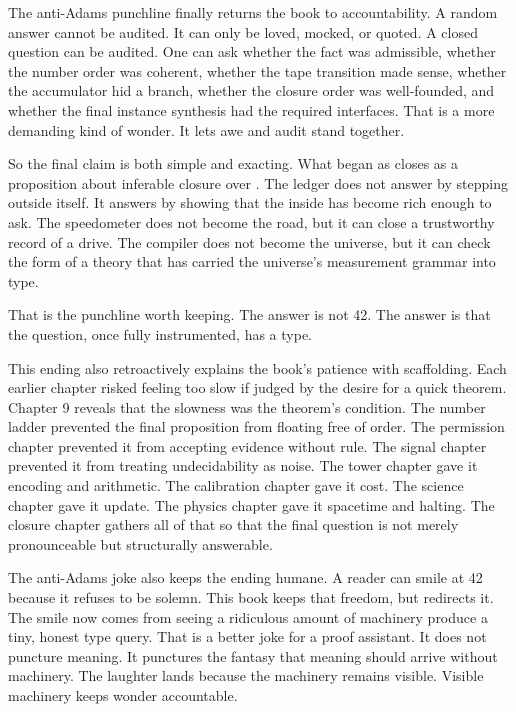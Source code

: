 The anti-Adams punchline finally returns the book to accountability. A random
answer cannot be audited. It can only be loved, mocked, or quoted. A closed
question can be audited. One can ask whether the fact was admissible, whether
the number order was coherent, whether the tape transition made sense, whether
the accumulator hid a branch, whether the closure order was well-founded, and
whether the final instance synthesis had the required interfaces. That is a
more demanding kind of wonder. It lets awe and audit stand together.

So the final claim is both simple and exacting. What began as 
closes as a proposition about inferable closure over . The ledger
does not answer by stepping outside itself. It answers by showing that the
inside has become rich enough to ask. The speedometer does not become the
road, but it can close a trustworthy record of a drive. The compiler does not
become the universe, but it can check the form of a theory that has carried
the universe's measurement grammar into type.

That is the punchline worth keeping. The answer is not 42. The answer is that
the question, once fully instrumented, has a type.

This ending also retroactively explains the book's patience with scaffolding.
Each earlier chapter risked feeling too slow if judged by the desire for a
quick theorem. Chapter 9 reveals that the slowness was the theorem's
condition. The number ladder prevented the final proposition from floating
free of order. The permission chapter prevented it from accepting evidence
without rule. The signal chapter prevented it from treating undecidability as
noise. The tower chapter gave it encoding and arithmetic. The calibration
chapter gave it cost. The science chapter gave it update. The physics chapter
gave it spacetime and halting. The closure chapter gathers all of that so that
the final question is not merely pronounceable but structurally answerable.

The anti-Adams joke also keeps the ending humane. A reader can smile at 42
because it refuses to be solemn. This book keeps that freedom, but redirects
it. The smile now comes from seeing a ridiculous amount of machinery produce
a tiny, honest type query. That is a better joke for a proof assistant. It
does not puncture meaning. It punctures the fantasy that meaning should arrive
without machinery.
The laughter lands because the machinery remains visible.
Visible machinery keeps wonder accountable.

